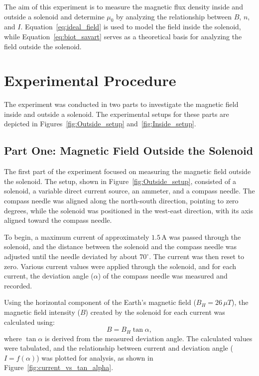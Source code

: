 \documentclass[journal]{IEEEtran}
\begin{document}
The aim of this experiment is to measure the magnetic flux density inside and outside a solenoid and determine \( \mu_0 \) by analyzing the relationship between \( B \), \( n \), and \( I \). Equation~\eqref{eq:ideal_field} is used to model the field inside the solenoid, while Equation~\eqref{eq:biot_savart} serves as a theoretical basis for analyzing the field outside the solenoid.

\section{Experimental Procedure}
The experiment was conducted in two parts to investigate the magnetic field inside and outside a solenoid. The experimental setups for these parts are depicted in Figures~\ref{fig:Outside_setup} and~\ref{fig:Inside_setup}.

\subsection{Part One: Magnetic Field Outside the Solenoid}
The first part of the experiment focused on measuring the magnetic field outside the solenoid. The setup, shown in Figure~\ref{fig:Outside_setup}, consisted of a solenoid, a variable direct current source, an ammeter, and a compass needle. The compass needle was aligned along the north-south direction, pointing to zero degrees, while the solenoid was positioned in the west-east direction, with its axis aligned toward the compass needle.

To begin, a maximum current of approximately \( 1.5 \, \text{A} \) was passed through the solenoid, and the distance between the solenoid and the compass needle was adjusted until the needle deviated by about \( 70^\circ \). The current was then reset to zero. Various current values were applied through the solenoid, and for each current, the deviation angle (\( \alpha \)) of the compass needle was measured and recorded.

Using the horizontal component of the Earth's magnetic field (\( B_H = 26 \, \mu T \)), the magnetic field intensity (\( B \)) created by the solenoid for each current was calculated using:
\begin{equation}
    B = B_H \tan \alpha, \label{eq:field_outside}
\end{equation}
where \( \tan \alpha \) is derived from the measured deviation angle. The calculated values were tabulated, and the relationship between current and deviation angle (\( I = f(\alpha) \)) was plotted for analysis, as shown in Figure~\ref{fig:current_vs_tan_alpha}.
\end{document}
